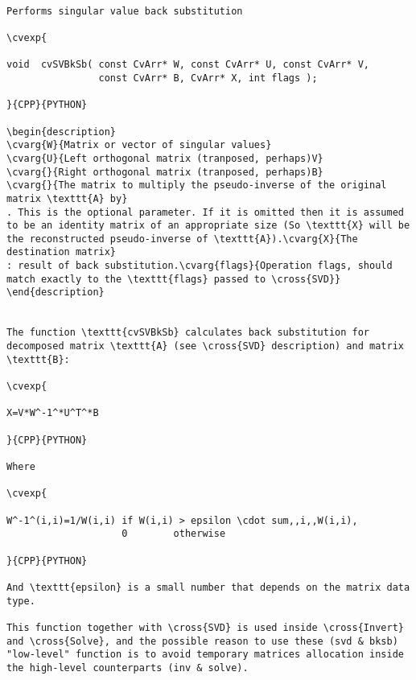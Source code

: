 \begin{verbatim}

Performs singular value back substitution

\cvexp{

void  cvSVBkSb( const CvArr* W, const CvArr* U, const CvArr* V,
                const CvArr* B, CvArr* X, int flags );

}{CPP}{PYTHON}

\begin{description}
\cvarg{W}{Matrix or vector of singular values}
\cvarg{U}{Left orthogonal matrix (tranposed, perhaps)V}
\cvarg{}{Right orthogonal matrix (tranposed, perhaps)B}
\cvarg{}{The matrix to multiply the pseudo-inverse of the original matrix \texttt{A} by}
. This is the optional parameter. If it is omitted then it is assumed to be an identity matrix of an appropriate size (So \texttt{X} will be the reconstructed pseudo-inverse of \texttt{A}).\cvarg{X}{The destination matrix}
: result of back substitution.\cvarg{flags}{Operation flags, should match exactly to the \texttt{flags} passed to \cross{SVD}}
\end{description}


The function \texttt{cvSVBkSb} calculates back substitution for decomposed matrix \texttt{A} (see \cross{SVD} description) and matrix \texttt{B}:

\cvexp{

X=V*W^-1^*U^T^*B

}{CPP}{PYTHON}

Where

\cvexp{

W^-1^(i,i)=1/W(i,i) if W(i,i) > epsilon \cdot sum,,i,,W(i,i),
                    0        otherwise

}{CPP}{PYTHON}

And \texttt{epsilon} is a small number that depends on the matrix data type.

This function together with \cross{SVD} is used inside \cross{Invert} and \cross{Solve}, and the possible reason to use these (svd & bksb) "low-level" function is to avoid temporary matrices allocation inside the high-level counterparts (inv & solve).


\end{verbatim}
